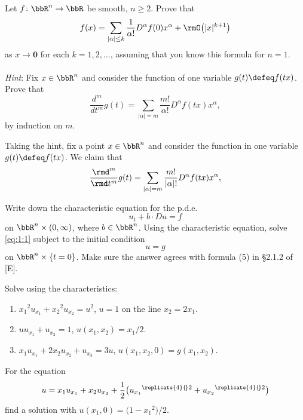 \begin{problem}
  Let \(f\colon\bbR^n\to\bbR\) be smooth, \(n\geq 2\). Prove that
  \[
    f(x)=\sum_{|\alpha|\leq k}
    \frac{1}{\alpha!}D^\alpha f(0)x^\alpha+\rmO\bigl(|x|^{k+1}\bigr)
  \]
  as \(x\to\mathbf{0}\) for each \(k=1,2,\dotsc\), assuming that you know this
  formula for \(n=1\).
  \\\\
  \emph{Hint}: Fix \(x\in\bbR^n\) and consider the function of one variable
  \(g(t)\defeq f(tx)\). Prove that
  \[
    \frac{d^m}{d t^m}g(t)
    =\sum_{|\alpha|=m}\frac{m!}{\alpha!} D^\alpha f(tx)x^\alpha,
  \]
  by induction on \(m\).
\end{problem}
\begin{solution}
  Taking the hint, fix a point \(x\in\bbR^n\) and consider the function in
  one variable \(g(t)\defeq f(tx)\). We claim that
  \[
    \frac{\rmd^m}{\rmd t^m}g(t)
    =\sum_{|\alpha|=m}\frac{m!}{|\alpha|!} D^\alpha f(tx)x^\alpha,
  \]
\end{solution}
\newpage

\begin{problem}
  Write down the characteristic equation for the p.d.e.\@
  \[
    \label{eq:1:1}
    \tag{\(*\)}
    u_t+b\cdot Du=f
  \]
  on \(\bbR^n\times(0,\infty)\), where \(b\in\bbR^n\). Using the
  characteristic equation, solve \eqref{eq:1:1} subject to the initial
  condition
  \[
    u=g
  \]
  on \(\bbR^n\times\{t=0\}\). Make sure the answer agrees with formula (5)
  in \S 2.1.2 of [E].
\end{problem}
\begin{solution}

\end{solution}
\newpage

\begin{problem}
  Solve using the characteristics:
  \begin{enumerate}[label=(\alph*)]
  \item \({x_1}^{\!2}u_{x_1}+{x_2}^{\!2}u_{x_2}=u^2\), \(u=1\) on the line
    \(x_2=2x_1\).
  \item \(uu_{x_1}+u_{x_2}=1\), \(u(x_1,x_2)=x_1/2\).
  \item \(x_1u_{x_1}+2x_2u_{x_2}+u_{x_3}=3u\),
    \(u(x_1,x_2,0)=g(x_1,x_2)\).
  \end{enumerate}
\end{problem}
\begin{solution}

\end{solution}
\newpage

\begin{problem}
  For the equation
  \[
    u=x_1u_{x_1}+x_2u_{x_2}
    +\frac{1}{2}\bigl({u_{x_1}}^{\replicate{4}{\!}2}+{u_{x_2}}^{\replicate{4}{\!}2}\bigr)
  \]
  find a solution with \(u(x_1,0)=\bigl(1-{x_1}^{\!2}\bigr)/2\).
\end{problem}
\begin{solution}

\end{solution}

